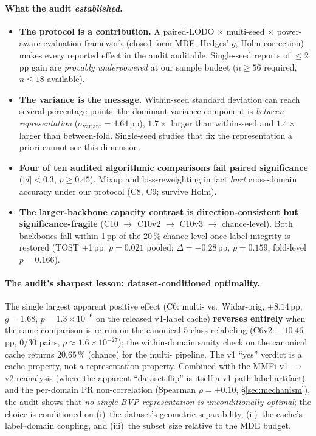 \documentclass[11pt]{article}
\theoremstyle{definition}
\newcommand{\Rx}{\text{Rx}}
\begin{document}
\paragraph{What the audit \emph{established}.}
\begin{itemize}
    \item \textbf{The protocol is a contribution.} A paired-LODO $\times$ multi-seed $\times$ power-aware evaluation framework (closed-form MDE, Hedges' $g$, Holm correction) makes every reported effect in the audit auditable. Single-seed reports of $\le 2$\,pp gain are \emph{provably underpowered} at our sample budget ($n \ge 56$ required, $n \le 18$ available).
    \item \textbf{The variance is the message.} Within-seed standard deviation can reach several percentage points; the dominant variance component is \emph{between-representation} ($\sigma_{\text{variant}} = 4.64$\,pp), $1.7\times$ larger than within-seed and $1.4\times$ larger than between-fold. Single-seed studies that fix the representation a priori cannot see this dimension.
    \item \textbf{Four of ten audited algorithmic comparisons fail paired significance} ($|d| < 0.3$, $p \geq 0.45$). Mixup and loss-reweighting in fact \emph{hurt} cross-domain accuracy under our protocol (C8, C9; survive Holm).
    \item \textbf{The larger-backbone capacity contrast is direction-consistent but significance-fragile} (C10 $\rightarrow$ C10v2 $\rightarrow$ C10v3 $\rightarrow$ chance-level). Both backbones fall within 1\,pp of the 20\,\% chance level once label integrity is restored (TOST $\pm$1\,pp: $p = 0.021$ pooled; $\Delta = -0.28$\,pp, $p = 0.159$, fold-level $p = 0.166$).
\end{itemize}

\paragraph{The audit's sharpest lesson: dataset-conditioned optimality.}
The single largest apparent positive effect (C6: multi-\Rx{} vs.\ Widar-orig, $+8.14$\,pp, $g = 1.68$, $p = 1.3\times10^{-6}$ on the released v1-label cache) \textbf{reverses entirely} when the same comparison is re-run on the canonical 5-class relabeling (C6v2: $-10.46$\,pp, $0/30$ pairs, $p \approx 1.6\times10^{-27}$); the within-domain sanity check on the canonical cache returns $20.65\,\%$ (chance) for the multi-\Rx{} pipeline. The v1 ``yes'' verdict is a cache property, not a representation property. Combined with the MMFi v1 $\rightarrow$ v2 reanalysis (where the apparent ``dataset flip'' is itself a v1 path-label artifact) and the per-domain PR non-correlation (Spearman $\rho = +0.10$, \S\ref{sec:mechanism}), the audit shows that \emph{no single BVP representation is unconditionally optimal}; the choice is conditioned on (i)~the dataset's geometric separability, (ii)~the cache's label--domain coupling, and (iii)~the subset size relative to the MDE budget.
\end{document}
